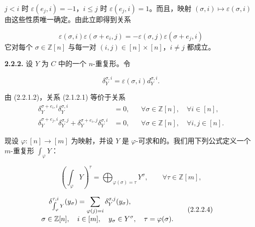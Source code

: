 \clearpage
{}%
%
$j<i$ 时 $\varepsilon(e_j,i)=-1$，$i\leq j$ 时
$\varepsilon(e_j,i)=1$。而且，映射
$(\sigma,i)\mapsto\varepsilon(\sigma,i)$ 由这些性质唯一确定。由此立即得到关系

\begin{equation}
  \varepsilon(\sigma,i)\varepsilon(\sigma+e_i,j)
  =-\varepsilon(\sigma,j)\varepsilon(\sigma+e_j,i)
  \tag{2.2.1.2}
\end{equation}
它对每个 $\sigma\in\mathbb Z[n]$ 与每一对
$(i,j)\in[n]\times[n]$，$i\neq j$ 都成立。

\noindent\textbf{2.2.2.}\quad
设 $Y$ 为 $C$ 中的一个 $n$-重复形。令

\begin{equation}
  \delta_Y^{\sigma,i}=\varepsilon(\sigma,i)d_Y^{\sigma,i}.
  \tag{2.2.2.1}
\end{equation}

由 (2.2.1.2)，关系 (2.1.2.1) 等价于关系
\begin{equation}
  \begin{aligned}
    \delta_Y^{\sigma+e_i,i}\delta_Y^{\sigma,i}
      &=0,
      &&\forall\sigma\in\mathbb Z[n],\quad\forall i\in[n],\\
    \delta_Y^{\sigma+e_j,i}\delta_Y^{\sigma,j}
      +\delta_Y^{\sigma+e_i,j}\delta_Y^{\sigma,i}
      &=0,
      &&\forall\sigma\in\mathbb Z[n],\quad\forall i,j\in[n].
  \end{aligned}
  \tag{2.2.2.2}
\end{equation}

现设 $\varphi\colon[n]\to[m]$ 为映射，并设 $Y$ 是
$\varphi$-可求和的。我们用下列公式定义一个 $m$-重复形 $\int_\varphi Y$：

\begin{equation}
  \left(\int_\varphi Y\right)^\tau
  =\bigoplus_{\varphi(\sigma)=\tau}Y^\sigma,
  \qquad \forall\tau\in\mathbb Z[m],
  \tag{2.2.2.3}
\end{equation}

\begin{equation}
  \begin{aligned}
    \delta_{\int_\varphi Y}^{\tau,i}(y_\sigma)
      &=\sum_{\varphi(j)=i}\delta_Y^{\sigma,j}(y_\sigma),\\[-1mm]
    &\hspace{-18mm}
      \sigma\in\mathbb Z[n],\quad i\in[m],\quad
      y_\sigma\in Y^\sigma,\quad\tau=\varphi(\sigma).
  \end{aligned}
  \tag{2.2.2.4}
\end{equation}

